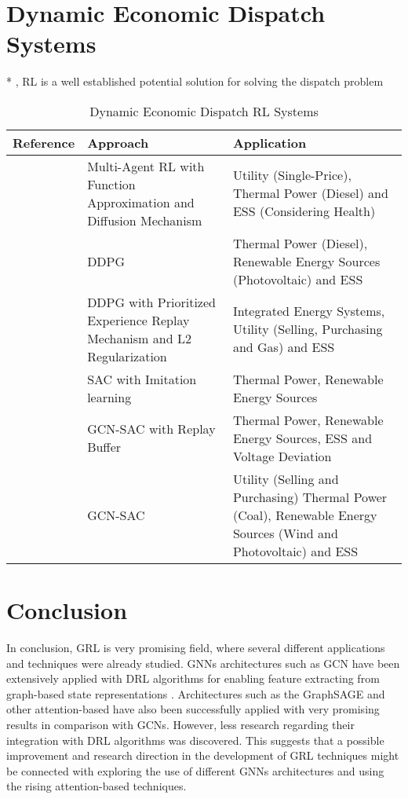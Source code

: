 \section{Dynamic Economic Dispatch Systems}

* \cite{pereraApplicationsReinforcementLearning2021}, RL is a well established potential solution for solving the dispatch problem


\begin{table}[h!]
	\centering
	\caption{Dynamic Economic Dispatch \ac{RL} Systems}
	\begin{tabular}{|P{2cm}|P{4cm}|p{6cm}|  }
		\hline
		\textbf{Reference} & \textbf{Approach} & \textbf{Application} \\
		\hline
		
 		\cite{liuDistributedEconomicDispatch2018b} & Multi-Agent \ac{RL} with Function Approximation and Diffusion Mechanism & Utility (Single-Price), Thermal Power (Diesel) and \ac{ESS} (Considering Health)\\
 		\hline
 		\cite{leiDynamicEnergyDispatch2021} & DDPG & Thermal Power (Diesel), Renewable Energy Sources (Photovoltaic) and \ac{ESS} \\
 		\hline 
 		\cite{yangDynamicEnergyDispatch2021} & DDPG with Prioritized Experience Replay Mechanism and L2 Regularization& Integrated Energy Systems, Utility (Selling, Purchasing and Gas) and \ac{ESS} \\
 		\hline
 		\cite{hanAutonomousControlTechnology2023} & SAC with Imitation learning & Thermal Power, Renewable Energy Sources \\
 		\hline
 		\cite{chenScalableGraphReinforcement2023} & GCN-SAC with Replay Buffer & Thermal Power, Renewable Energy Sources, \ac{ESS} and Voltage Deviation \\
 		\hline
 		\cite{liNovelGraphReinforcement2022} & GCN-SAC & Utility (Selling and Purchasing) Thermal Power (Coal), Renewable Energy Sources (Wind and Photovoltaic) and \ac{ESS} \\
 		\hline
	\end{tabular}
\end{table}


\section{Conclusion}

In conclusion, \ac{GRL} is very promising field, where several different applications and techniques were already studied. \acp{GNN} architectures such as \ac{GCN} have been extensively applied with DRL algorithms for enabling feature extracting from graph-based state representations \cite{chenScalableGraphReinforcement2023, chenAutonomousExplorationUncertainty2020}. Architectures such as the GraphSAGE and other attention-based have also been successfully applied with very promising results \cite{peiEmergencyControlStrategy2023, xingRealtimeOptimalScheduling2023} in comparison with \acp{GCN}. However, less research regarding their integration with DRL algorithms was discovered. This suggests that a possible improvement and research direction in the development of \ac{GRL} techniques might be connected with exploring the use of different \acp{GNN} architectures and using the rising attention-based techniques.

